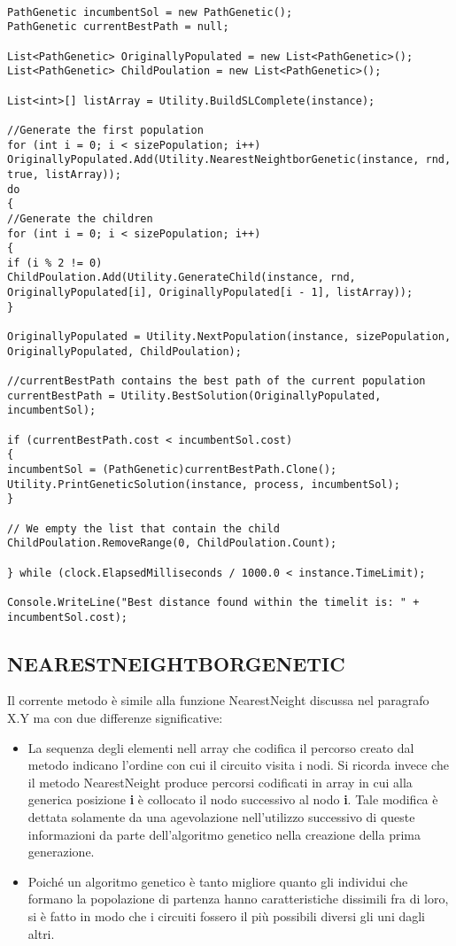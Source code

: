 \documentclass[11pt]{article}
\begin{document}
\begin{lstlisting}

PathGenetic incumbentSol = new PathGenetic();
PathGenetic currentBestPath = null;

List<PathGenetic> OriginallyPopulated = new List<PathGenetic>();
List<PathGenetic> ChildPoulation = new List<PathGenetic>();

List<int>[] listArray = Utility.BuildSLComplete(instance);

//Generate the first population
for (int i = 0; i < sizePopulation; i++)
OriginallyPopulated.Add(Utility.NearestNeightborGenetic(instance, rnd, true, listArray));
do
{
//Generate the children
for (int i = 0; i < sizePopulation; i++)
{
if (i % 2 != 0)
ChildPoulation.Add(Utility.GenerateChild(instance, rnd, OriginallyPopulated[i], OriginallyPopulated[i - 1], listArray));
}

OriginallyPopulated = Utility.NextPopulation(instance, sizePopulation, OriginallyPopulated, ChildPoulation);

//currentBestPath contains the best path of the current population
currentBestPath = Utility.BestSolution(OriginallyPopulated, incumbentSol);

if (currentBestPath.cost < incumbentSol.cost)
{
incumbentSol = (PathGenetic)currentBestPath.Clone();
Utility.PrintGeneticSolution(instance, process, incumbentSol);
}

// We empty the list that contain the child
ChildPoulation.RemoveRange(0, ChildPoulation.Count);

} while (clock.ElapsedMilliseconds / 1000.0 < instance.TimeLimit);

Console.WriteLine("Best distance found within the timelit is: " + incumbentSol.cost);

\end{lstlisting}

\subsection*{NEARESTNEIGHTBORGENETIC}
\label{sec:NearestNGS}

Il corrente metodo è simile alla funzione NearestNeight discussa nel paragrafo X.Y ma con due differenze significative:

\begin{itemize}
    \item La sequenza degli elementi nell array che codifica il percorso creato dal metodo indicano l'ordine con cui il circuito visita i nodi. Si ricorda invece che il metodo NearestNeight produce percorsi codificati in array in cui alla generica posizione \textbf{i} è collocato il nodo successivo al nodo \textbf{i}. Tale modifica è dettata solamente da una agevolazione nell'utilizzo successivo di queste informazioni da parte dell'algoritmo genetico nella creazione della prima generazione.
    
    \item Poiché un algoritmo genetico è tanto migliore quanto gli individui che formano la popolazione di partenza hanno caratteristiche dissimili fra di loro, si è fatto in modo che i circuiti fossero il più possibili diversi gli uni dagli altri.
\end{itemize}
\end{document}
